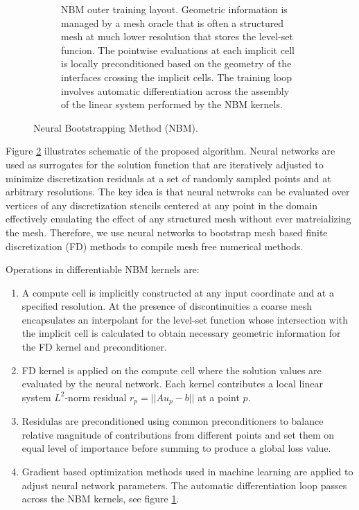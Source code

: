 \documentclass{elsarticle}
\begin{document}
\begin{figure}
\begin{subfigure}[b]{\textwidth}
         \caption{NBM outer training layout. Geometric information is managed by a mesh oracle that is often a structured mesh at much lower resolution that stores the level-set funcion. The pointwise evaluations at each implicit cell is locally preconditioned based on the geometry of the interfaces crossing the implicit cells. The training loop involves automatic differentiation across the assembly of the linear system performed by the NBM kernels.}
         \label{fig:trainingloop}
     \end{subfigure}
        \caption{Neural Bootstrapping Method (NBM).}
        \label{fig:nbm}
\end{figure}


Figure \ref{fig:nbm} illustrates schematic of the proposed algorithm. Neural networks are used as surrogates for the solution function that are iteratively adjusted to minimize discretization residuals at a set of randomly sampled points and at arbitrary resolutions. The key idea is that neural netwroks can be evaluated over vertices of any discretization stencils centered at any point in the domain effectively emulating the effect of any structured mesh without ever matreializing the mesh. Therefore, we use neural networks to bootstrap mesh based finite discretization (FD) methods to compile mesh free numerical methods.

Operations in differentiable NBM kernels are:
\begin{enumerate}

\item A compute cell is implicitly constructed at any input coordinate and at a specified resolution. At the presence of discontinuities a coarse mesh encapsulates an interpolant for the level-set function whose intersection with the implicit cell is calculated to obtain necessary geometric information for the FD kernel and preconditioner.

\item FD kernel is applied on the compute cell where the solution values are evaluated by the neural network. Each kernel contributes a local linear system $L^2$-norm residual $r_p = ||A u_p - b||$ at a point $p$.

\item Residulas are preconditioned using common preconditioners to balance relative magnitude of contributions from different points and set them on equal level of importance before summing to produce a global loss value.

\item Gradient based optimization methods used in machine learning are applied to adjust neural network parameters. The automatic differentiation loop passes across the NBM kernels, see figure \ref{fig:trainingloop}.

\end{enumerate}
\end{document}
